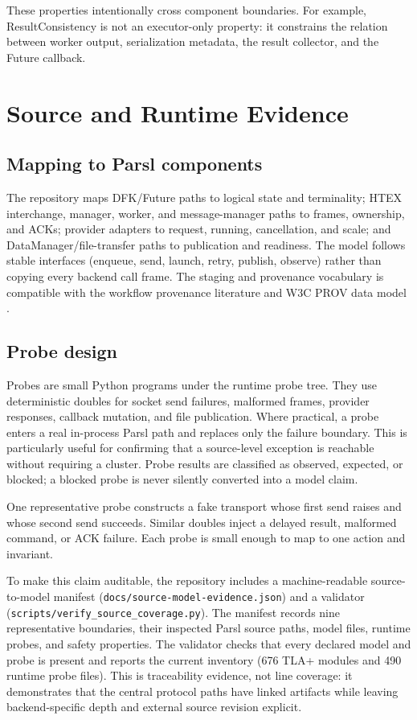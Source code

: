\documentclass[11pt,a4paper]{article}
\begin{document}
These properties intentionally cross component boundaries. For example, ResultConsistency is not
an executor-only property: it constrains the relation between worker output, serialization metadata,
the result collector, and the Future callback.

\section{Source and Runtime Evidence}
\subsection{Mapping to Parsl components}
The repository maps DFK/Future paths to logical state and terminality; HTEX interchange, manager,
worker, and message-manager paths to frames, ownership, and ACKs; provider adapters to request,
running, cancellation, and scale; and DataManager/file-transfer paths to publication and readiness.
The model follows stable interfaces (enqueue, send, launch, retry, publish, observe) rather than
copying every backend call frame. The staging and provenance vocabulary is compatible with the
workflow provenance literature and W3C PROV data model \cite{moreau2013prov,cuevas2013workflows,chen2021provenance}.

\subsection{Probe design}
Probes are small Python programs under the runtime probe tree. They use deterministic doubles for
socket send failures, malformed frames, provider responses, callback mutation, and file publication.
Where practical, a probe enters a real in-process Parsl path and replaces only the failure boundary.
This is particularly useful for confirming that a source-level exception is reachable without
requiring a cluster. Probe results are classified as observed, expected, or blocked; a blocked probe
is never silently converted into a model claim.

One representative probe constructs a fake transport whose first send raises and whose second send
succeeds. Similar doubles inject a delayed result, malformed command, or ACK failure. Each probe is
small enough to map to one action and invariant.

To make this claim auditable, the repository includes a machine-readable source-to-model manifest
(\texttt{docs/source-model-evidence.json}) and a validator
(\texttt{scripts/verify\_source\_coverage.py}). The
manifest records nine representative boundaries, their inspected Parsl source paths, model files,
runtime probes, and safety properties. The validator checks that every declared model and probe is
present and reports the current inventory (676 TLA+ modules and 490 runtime probe files). This is
traceability evidence, not line coverage: it demonstrates that the central protocol paths have
linked artifacts while leaving backend-specific depth and external source revision explicit.
\end{document}
